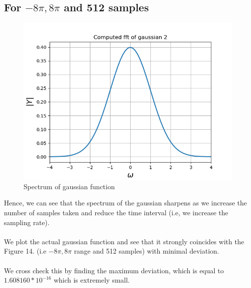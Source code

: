 \documentclass[11pt]{article}
\begin{document}
\subsection{For $-8\pi,8\pi$ and 512 samples}
\begin{figure}[H]
    \centering
    \includegraphics[scale = 0.75]{Figure_7b.png}
    \caption{Spectrum of gaussian function}
\end{figure}

Hence, we can see that the spectrum of the gaussian sharpens as we increase the number of samples taken and reduce the time interval (i.e, we increase the sampling rate).\\~\\
We plot the actual gaussian function and see that it strongly coincides with the Figure 14. (i.e $-8\pi,8\pi$ range and 512 samples) with minimal deviation.\\~\\
We cross check this by finding the maximum deviation, which is equal to \textbf{$1.608160*10^{-16}$} which is extremely small.
\end{document}
